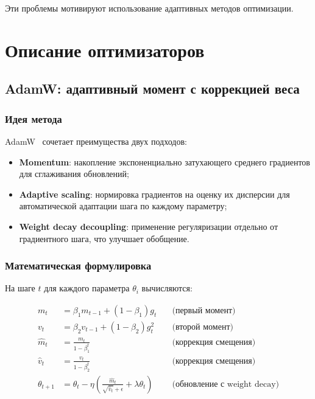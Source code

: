\documentclass[a4paper,12pt]{article}
\begin{document}
Эти проблемы мотивируют использование адаптивных методов оптимизации.
\newpage

\section{Описание оптимизаторов}
\label{sec:optimizers}

\subsection{AdamW: адаптивный момент с коррекцией веса}

\subsubsection{Идея метода}

AdamW~\cite{loshchilov2019adamw} сочетает преимущества двух подходов:
\begin{itemize}
    \item \textbf{Momentum}: накопление экспоненциально затухающего среднего градиентов для сглаживания обновлений;
    \item \textbf{Adaptive scaling}: нормировка градиентов на оценку их дисперсии для автоматической адаптации шага по каждому параметру;
    \item \textbf{Weight decay decoupling}: применение регуляризации отдельно от градиентного шага, что улучшает обобщение.
\end{itemize}

\subsubsection{Математическая формулировка}

На шаге $t$ для каждого параметра $\theta_i$ вычисляются:

\begin{align}
    m_t &= \beta_1 m_{t-1} + (1 - \beta_1) g_t \quad &\text{(первый момент)} \\
    v_t &= \beta_2 v_{t-1} + (1 - \beta_2) g_t^2 \quad &\text{(второй момент)} \\
    \hat{m}_t &= \frac{m_t}{1 - \beta_1^t} \quad &\text{(коррекция смещения)} \\
    \hat{v}_t &= \frac{v_t}{1 - \beta_2^t} \quad &\text{(коррекция смещения)} \\
    \theta_{t+1} &= \theta_t - \eta \left( \frac{\hat{m}_t}{\sqrt{\hat{v}_t} + \epsilon} + \lambda \theta_t \right) \quad &\text{(обновление с weight decay)}
\end{align}
\end{document}
